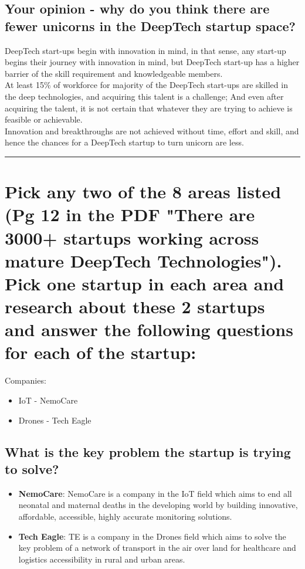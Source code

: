 \documentclass[a4paper]{article}
\begin{document}
\subsection{Your opinion - why do you think there are fewer unicorns in the DeepTech startup space?}

\large{DeepTech start-ups begin with innovation in mind, in that sense, any start-up begins their journey with innovation in mind, but DeepTech start-up has a higher barrier of the skill requirement and knowledgeable members.
\\At least 15\% of workforce for majority of the DeepTech start-ups are skilled in the deep technologies, and acquiring this talent is a challenge; And even after acquiring the talent, it is not certain that whatever they are trying to achieve is feasible or achievable.
\\Innovation and breakthroughs are not achieved without time, effort and skill, and hence the chances for a DeepTech startup to turn unicorn are less.
}

\rule{\textwidth}{0.4pt}

\section{Pick any two of the 8 areas listed (Pg 12 in the PDF "There are 3000+ startups working across mature DeepTech Technologies").
Pick one startup in each area and research about these 2 startups and answer the following questions for each of the startup:}

\large{Companies:
\begin{itemize}
    \item IoT - NemoCare \cite{nemocare}
    \item Drones - Tech Eagle \cite{techeagle}
\end{itemize}
}

\subsection{What is the key problem the startup is trying to solve?}

\large{
\begin{itemize}
\item \textbf{NemoCare}: NemoCare is a company in the IoT field which aims to end all neonatal and maternal deaths in the developing world by building innovative, affordable, accessible, highly accurate monitoring solutions.
\item \textbf{Tech Eagle}: TE is a company in the Drones field which aims to solve the key problem of a network of transport in the air over land for healthcare and logistics accessibility in rural and urban areas.
\end{itemize}
}
\end{document}
